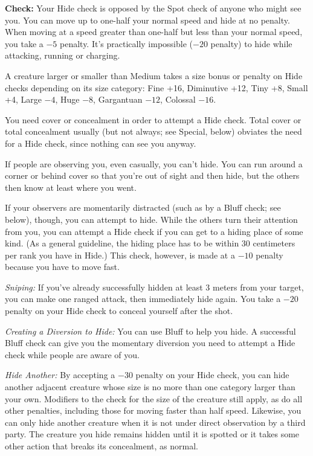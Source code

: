 \textbf{Check:} Your Hide check is opposed by the Spot check of anyone who might see you. You can move up to one-half your normal speed and hide at no penalty. When moving at a speed greater than one-half but less than your normal speed, you take a $-5$ penalty. It's practically impossible ($-20$ penalty) to hide while attacking, running or charging.

A creature larger or smaller than Medium takes a size bonus or penalty on Hide checks depending on its size category: Fine +16, Diminutive +12, Tiny +8, Small +4, Large $-4$, Huge $-8$, Gargantuan $-12$, Colossal $-16$.

You need cover or concealment in order to attempt a Hide check. Total cover or total concealment usually (but not always; see Special, below) obviates the need for a Hide check, since nothing can see you anyway.

If people are observing you, even casually, you can't hide. You can run around a corner or behind cover so that you're out of sight and then hide, but the others then know at least where you went.

If your observers are momentarily distracted (such as by a Bluff check; see below), though, you can attempt to hide. While the others turn their attention from you, you can attempt a Hide check if you can get to a hiding place of some kind. (As a general guideline, the hiding place has to be within 30 centimeters per rank you have in Hide.) This check, however, is made at a $-10$ penalty because you have to move fast.

\textit{Sniping:} If you've already successfully hidden at least 3 meters from your target, you can make one ranged attack, then immediately hide again. You take a $-20$ penalty on your Hide check to conceal yourself after the shot.

\textit{Creating a Diversion to Hide:} You can use Bluff to help you hide. A successful Bluff check can give you the momentary diversion you need to attempt a Hide check while people are aware of you.

\textit{Hide Another:} By accepting a $-30$ penalty on your Hide check, you can hide another adjacent creature whose size is no more than one category larger than your own. Modifiers to the check for the size of the creature still apply, as do all other penalties, including those for moving faster than half speed. Likewise, you can only hide another creature when it is not under direct observation by a third party. The creature you hide remains hidden until it is spotted or it takes some other action that breaks its concealment, as normal.

